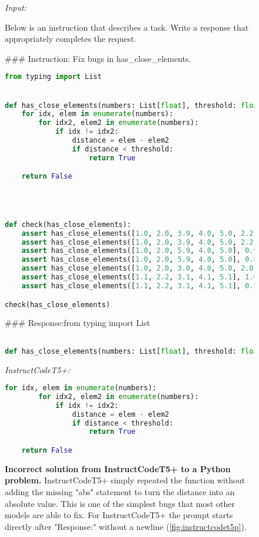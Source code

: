 \begin{figure}[htbp]
\hrulefill

\emph{Input:}

\hrulefill

Below is an instruction that describes a task. Write a response that appropriately completes the request.

\#\#\# Instruction: Fix bugs in has\_close\_elements.
\begin{lstlisting}[language=Python,breaklines=true,basicstyle=\ttfamily\scriptsize]
from typing import List


def has_close_elements(numbers: List[float], threshold: float) -> bool:
    for idx, elem in enumerate(numbers):
        for idx2, elem2 in enumerate(numbers):
            if idx != idx2:
                distance = elem - elem2
                if distance < threshold:
                    return True

    return False




def check(has_close_elements):
    assert has_close_elements([1.0, 2.0, 3.9, 4.0, 5.0, 2.2], 0.3) == True
    assert has_close_elements([1.0, 2.0, 3.9, 4.0, 5.0, 2.2], 0.05) == False
    assert has_close_elements([1.0, 2.0, 5.9, 4.0, 5.0], 0.95) == True
    assert has_close_elements([1.0, 2.0, 5.9, 4.0, 5.0], 0.8) == False
    assert has_close_elements([1.0, 2.0, 3.0, 4.0, 5.0, 2.0], 0.1) == True
    assert has_close_elements([1.1, 2.2, 3.1, 4.1, 5.1], 1.0) == True
    assert has_close_elements([1.1, 2.2, 3.1, 4.1, 5.1], 0.5) == False

check(has_close_elements)
\end{lstlisting}
\#\#\# Response:from typing import List \begin{lstlisting}[language=Python,breaklines=true,basicstyle=\ttfamily\scriptsize]

def has_close_elements(numbers: List[float], threshold: float) -> bool:
\end{lstlisting}

\hrulefill

\emph{InstructCodeT5+:}

\hrulefill

\begin{lstlisting}[language=Python,breaklines=true,basicstyle=\ttfamily\scriptsize]
    for idx, elem in enumerate(numbers):
        for idx2, elem2 in enumerate(numbers):
            if idx != idx2:
                distance = elem - elem2
                if distance < threshold:
                    return True

    return False
\end{lstlisting}
\caption{\textbf{Incorrect solution from InstructCodeT5+ to a \evalf{} Python problem.} InstructCodeT5+ simply repeated the function without adding the missing "abs" statement to turn the distance into an absolute value. This is one of the simplest bugs that most other models are able to fix. For InstructCodeT5+ the prompt starts directly after "Response:" without a newline (\autoref{fig:instructcodet5p}).}
\label{fig:instructcodet5ppy}
\end{figure}

